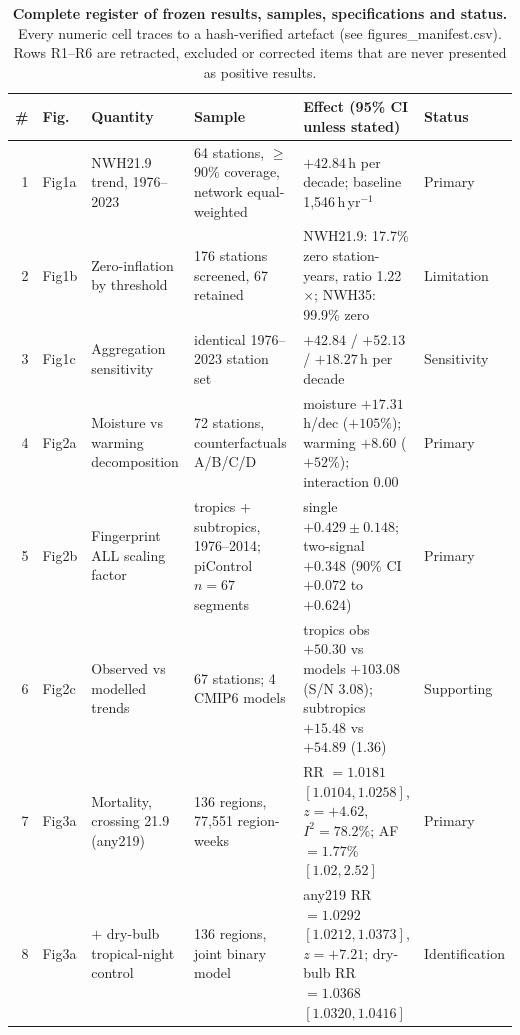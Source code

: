 \begin{table}[p]
\centering
\scriptsize
\caption{\textbf{Complete register of frozen results, samples, specifications and status.}
Every numeric cell traces to a hash-verified artefact (see figures\_manifest.csv). Rows R1--R6 are
retracted, excluded or corrected items that are never presented as positive results.}
\label{tab:edtable1}
\begin{tabular}{rllp{2.6cm}p{4.6cm}l}
\toprule
\# & Fig. & Quantity & Sample & Effect (95\% CI unless stated) & Status \\
\midrule
1 & Fig1a & NWH21.9 trend, 1976--2023 & 64 stations, $\geq$90\% coverage, network equal-weighted & $+42.84$\,h per decade; baseline 1,546\,h\,yr$^{-1}$ & Primary \\
2 & Fig1b & Zero-inflation by threshold & 176 stations screened, 67 retained & NWH21.9: 17.7\% zero station-years, ratio 1.22$\times$; NWH35: 99.9\% zero & Limitation \\
3 & Fig1c & Aggregation sensitivity & identical 1976--2023 station set & $+42.84$ / $+52.13$ / $+18.27$\,h per decade & Sensitivity \\
4 & Fig2a & Moisture vs warming decomposition & 72 stations, counterfactuals A/B/C/D & moisture $+17.31$\,h/dec ($+105\%$); warming $+8.60$ ($+52\%$); interaction 0.00 & Primary \\
5 & Fig2b & Fingerprint ALL scaling factor & tropics + subtropics, 1976--2014; piControl $n=67$ segments & single $+0.429\pm0.148$; two-signal $+0.348$ (90\% CI $+0.072$ to $+0.624$) & Primary \\
6 & Fig2c & Observed vs modelled trends & 67 stations; 4 CMIP6 models & tropics obs $+50.30$ vs models $+103.08$ (S/N 3.08); subtropics $+15.48$ vs $+54.89$ (1.36) & Supporting \\
7 & Fig3a & Mortality, crossing 21.9\,\dd{} (any219) & 136 regions, 77,551 region-weeks & RR $=1.0181$ $[1.0104,1.0258]$, $z=+4.62$, $I^2=78.2\%$; AF $=1.77\%$ $[1.02,2.52]$ & Primary \\
8 & Fig3a & $+$ dry-bulb tropical-night control & 136 regions, joint binary model & any219 RR $=1.0292$ $[1.0212,1.0373]$, $z=+7.21$; dry-bulb RR $=1.0368$ $[1.0320,1.0416]$ & Identification \\

\end{tabular}
\end{table}
